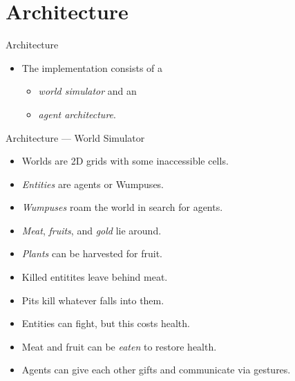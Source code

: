 \documentclass{beamer}
\begin{document}
   \section{Architecture}
   
   \begin{frame}{Architecture}
       \begin{itemize}
          \item The implementation consists of a
             \begin{itemize}
                \item \emph{world simulator} and an
                \item \emph{agent architecture}.
             \end{itemize}
       \end{itemize}
   \end{frame}
   
   \begin{frame}{Architecture --- World Simulator}
      \begin{itemize}
         \item Worlds are 2D grids with some inaccessible cells.
         \item \emph{Entities} are agents or Wumpuses.
         \item \emph{Wumpuses} roam the world in search for agents.
       \item \emph{Meat}, \emph{fruits}, and \emph{gold} lie around.
         \item \emph{Plants} can be harvested for fruit.
         \item Killed entitites leave behind meat.
         
         \vspace{2mm}
         \item Pits kill whatever falls into them.
         \vspace{2mm}
         \item Entities can fight, but this costs health.
         \item Meat and fruit can be \emph{eaten} to restore health.
         \item Agents can give each other gifts and communicate via gestures.
      \end{itemize}
   \end{frame}
   
\end{document}
